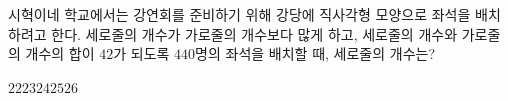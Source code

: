 시혁이네 학교에서는 강연회를 준비하기 위해 강당에 직사각형 모양으로 좌석을 배치하려고 한다. 세로줄의 개수가 가로줄의 개수보다 많게 하고, 세로줄의 개수와 가로줄의 개수의 합이 $42$가 되도록 $440$명의 좌석을 배치할 때, 세로줄의 개수는? 
\begin{choices32}{$22$}{$23$}{$24$}{$25$}{$26$}\end{choices32}
